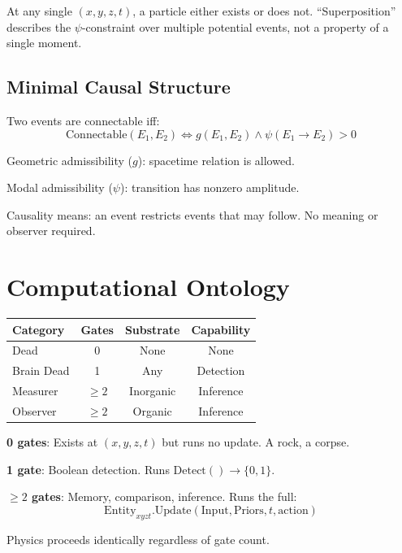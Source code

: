 \documentclass[aps,prl,twocolumn,showpacs,superscriptaddress,groupedaddress]{revtex4-2}
\begin{document}
At any single $(x,y,z,t)$, a particle either exists or does not. ``Superposition'' describes the $\psi$-constraint over multiple potential events, not a property of a single moment.

\subsection{Minimal Causal Structure}

Two events are connectable iff:
\begin{equation}
\text{Connectable}(E_1, E_2) \iff g(E_1, E_2) \land \psi(E_1 \to E_2) > 0
\end{equation}

Geometric admissibility ($g$): spacetime relation is allowed.

Modal admissibility ($\psi$): transition has nonzero amplitude.

Causality means: an event restricts events that may follow. No meaning or observer required.

\section{Computational Ontology}

\begin{table}[h]
\begin{tabular}{lccc}
\hline
Category & Gates & Substrate & Capability \\
\hline
Dead & 0 & None & None \\
Brain Dead & 1 & Any & Detection \\
Measurer & $\geq 2$ & Inorganic & Inference \\
Observer & $\geq 2$ & Organic & Inference \\
\hline
\end{tabular}
\end{table}

\textbf{0 gates}: Exists at $(x,y,z,t)$ but runs no update. A rock, a corpse.

\textbf{1 gate}: Boolean detection. Runs $\text{Detect}() \to \{0,1\}$.

\textbf{$\geq 2$ gates}: Memory, comparison, inference. Runs the full:
\begin{equation}
\text{Entity}_{xyzt}.\text{Update}(\text{Input}, \text{Priors}, t, \text{action})
\end{equation}

Physics proceeds identically regardless of gate count.
\end{document}
